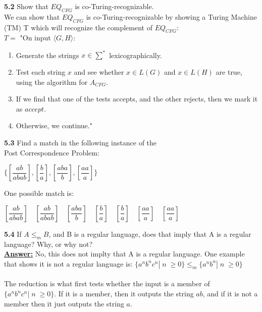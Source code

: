\documentclass[12pt]{article}
\newcommand\tab[1][1cm]{\hspace*{#1}}
\begin{document}
\textbf{5.2} Show that $EQ_{CFG}$ is co-Turing-recognizable. \\

We can show that $EQ_{CFG}$ is co-Turing-recognizable by showing a Turing Machine (TM)
T which will recognize the complement of $EQ_{CFG}$: \\

$T = $ "On input $ \langle G, H \rangle $:
\begin{enumerate}
	\item Generate the strings $x \in \sum^*$ lexicographically.
	\item Test each string $x$ and see whether $x \in L(G)$ and $x \in L(H)$ are true, using the algorithm for $A_{CFG}$.
	\item If we find that one of the tests accepts, and the other rejects, then we mark it as $accept$.
	\item Otherwise, we continue." \\
\end{enumerate}

\pagebreak
\textbf{5.3} \; Find a match in the following instance of the \\
\tab Post Correspondence Problem:

\begin{center}
	$\{ [ \dfrac{ab}{abab} ], [ \dfrac{b}{a} ], [ \dfrac{aba}{b} ], [ \dfrac{aa}{a} ] \}$ \\
\end{center}

One possible match is:
\begin{center}
	$ [ \dfrac{ab}{abab} ] \quad [ \dfrac{ab}{abab} ] \quad [ \dfrac{aba}{b} ] \quad [ \dfrac{b}{a} ]
\quad [ \dfrac{b}{a} ]     \quad [ \dfrac{aa}{a} ]    \quad [ \dfrac{aa}{a} ]  $
\end{center}

\leavevmode \newline

\textbf{5.4} If $A \le_m B$, and B is a regular language, does that imply that A is
a regular language? Why, or why not? \\

\textbf{\underline{Answer:}} No, this does not implty that A is a regular language.
One example that shows it is not a regular language is: 
$\{ a^n b^n c^n | \; n \; \ge 0 \} \le_m \{ a^n b^n | \; n \; \ge 0 \}$ \\ \\
The reduction is what first tests whether the input is a member of 
$\{ a^n b^n c^n | \; n \; \ge 0 \}$. If it is a member, then it outputs the string
$ab$, and if it is not a member then it just outputs the string $a$.
\end{document}
